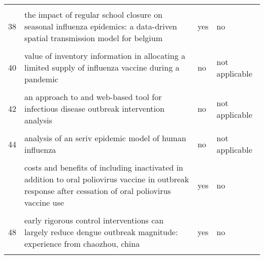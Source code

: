 \documentclass[
]{article}
\begin{document}
\begin{landscape}
\begin{longtable}{l>{\raggedright\arraybackslash}p{9cm}ll}
\cellcolor{gray!6}{37} & \cellcolor{gray!6}{simulation of key interventions for seasonal influenza outbreak control at school in changsha, china} & \cellcolor{gray!6}{yes} & \cellcolor{gray!6}{no}\\
38 & the impact of regular school closure on seasonal influenza epidemics: a data-driven spatial transmission model for belgium & yes & no\\
\cellcolor{gray!6}{39} & \cellcolor{gray!6}{the potential impact of case-area targeted interventions in response to cholera outbreaks: a modeling study} & \cellcolor{gray!6}{yes} & \cellcolor{gray!6}{no}\\
40 & value of inventory information in allocating a limited supply of influenza vaccine during a pandemic & no & not applicable\\
\addlinespace
\cellcolor{gray!6}{41} & \cellcolor{gray!6}{an age-structured model for cholera control with vaccination} & \cellcolor{gray!6}{no} & \cellcolor{gray!6}{not applicable}\\
42 & an approach to and web-based tool for infectious disease outbreak intervention analysis & no & not applicable\\
\cellcolor{gray!6}{43} & \cellcolor{gray!6}{an economic assessment of foot and mouth disease in japan} & \cellcolor{gray!6}{no} & \cellcolor{gray!6}{not applicable}\\
44 & analysis of an seriv epidemic model of human influenza & no & not applicable\\
\cellcolor{gray!6}{45} & \cellcolor{gray!6}{control strategies of avian influenza pandemic model with time delay} & \cellcolor{gray!6}{no} & \cellcolor{gray!6}{not applicable}\\
\addlinespace
46 & costs and benefits of including inactivated in addition to oral poliovirus vaccine in outbreak response after cessation of oral poliovirus vaccine use & yes & no\\
\cellcolor{gray!6}{47} & \cellcolor{gray!6}{deriving effective vaccine allocation strategies for pandemic influenza: comparison of an agent-based simulation and a compartmental model} & \cellcolor{gray!6}{no} & \cellcolor{gray!6}{not applicable}\\
48 & early rigorous control interventions can largely reduce dengue outbreak magnitude: experience from chaozhou, china & yes & no\\
\cellcolor{gray!6}{49} & \cellcolor{gray!6}{effects of reactive social distancing on the 1918 influenza pandemic} & \cellcolor{gray!6}{yes} & \cellcolor{gray!6}{yes}\\

\end{longtable}
\end{landscape}
\end{document}
